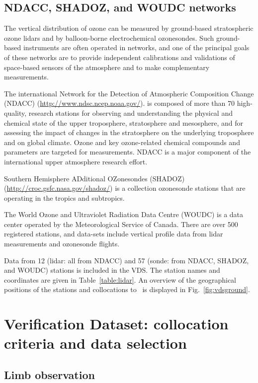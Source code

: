 \subsection{NDACC, SHADOZ, and WOUDC networks}


The vertical distribution of ozone can be measured by ground-based stratospheric 
ozone lidars and by balloon-borne electrochemical ozonesondes.
Such ground-based instruments are often operated in networks,
and one of the principal goals of these networks are to provide
independent calibrations and validations of space-based sensors
of the atmosphere and to make complementary measurements.

The international Network for the Detection of Atmospheric Composition Change (NDACC) 
(\url{http://www.ndsc.ncep.noaa.gov/}).
is composed of more than 70 high-quality, research stations for observing 
and understanding the physical and chemical 
state of the upper troposphere, stratosphere and mesosphere, 
and for assessing the impact of changes in the 
stratosphere on the underlying troposphere and on global climate.
Ozone and key ozone-related chemical compounds and parameters 
are targeted for measurements. NDACC is a major
component of the international upper atmosphere research
effort. 

Southern Hemisphere ADditional OZonesondes (SHADOZ)
(\url{http://croc.gsfc.nasa.gov/shadoz/})
is a collection ozonesonde stations that are operating in the 
tropics and subtropics.

The World Ozone and Ultraviolet Radiation Data Centre (WOUDC)
is a data center operated by the Meteorological Service of Canada.
There are over 500 registered stations,
and  data-sets include vertical profile data from lidar 
measurements and ozonesonde flights.

Data from 12 (lidar: all from NDACC) and 57 (sonde: from NDACC, SHADOZ, and WOUDC) 
stations is included in the VDS.
The station names and coordinates are given in Table~\ref{table:lidar}.  
An overview of the geographical positions of the stations and
collocations to \smr\ is  displayed in Fig.~\ref{fig:vdsground}.




\section{Verification Dataset: collocation criteria and data selection}
\label{sec:vdsselection}
\subsection{Limb observation}

